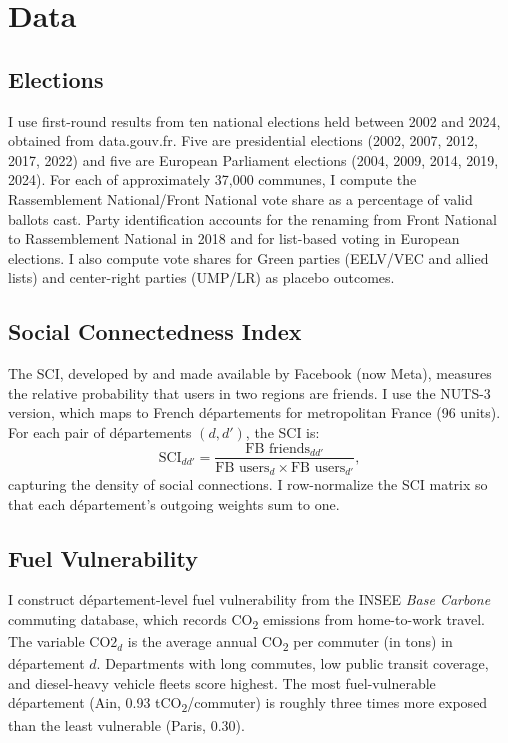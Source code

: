 \documentclass[12pt]{article}
\newcommand{\rn}{Rassemblement National}
\newcommand{\fn}{Front National}
\newcommand{\dept}{d\'{e}partement}
\newcommand{\depts}{d\'{e}partements}
\begin{document}

\section{Data}
\label{sec:data}

\subsection{Elections}

I use first-round results from ten national elections held between 2002 and 2024, obtained from data.gouv.fr. Five are presidential elections (2002, 2007, 2012, 2017, 2022) and five are European Parliament elections (2004, 2009, 2014, 2019, 2024). For each of approximately 37,000 communes, I compute the \rn{}/\fn{} vote share as a percentage of valid ballots cast. Party identification accounts for the renaming from \fn{} to \rn{} in 2018 and for list-based voting in European elections. I also compute vote shares for Green parties (EELV/VEC and allied lists) and center-right parties (UMP/LR) as placebo outcomes.

\subsection{Social Connectedness Index}

The SCI, developed by \citet{bailey2018social} and made available by Facebook (now Meta), measures the relative probability that users in two regions are friends. I use the NUTS-3 version, which maps to French \depts{} for metropolitan France (96 units). For each pair of \depts{} $(d, d')$, the SCI is:
\begin{equation}
\text{SCI}_{dd'} = \frac{\text{FB friends}_{dd'}}{\text{FB users}_d \times \text{FB users}_{d'}},
\end{equation}
capturing the density of social connections. I row-normalize the SCI matrix so that each \dept{}'s outgoing weights sum to one.

\subsection{Fuel Vulnerability}

I construct \dept{}-level fuel vulnerability from the INSEE \textit{Base Carbone} commuting database, which records CO\textsubscript{2} emissions from home-to-work travel. The variable $\text{CO2}_{d}$ is the average annual CO\textsubscript{2} per commuter (in tons) in \dept{} $d$. Departments with long commutes, low public transit coverage, and diesel-heavy vehicle fleets score highest. The most fuel-vulnerable \dept{} (Ain, 0.93 tCO\textsubscript{2}/commuter) is roughly three times more exposed than the least vulnerable (Paris, 0.30).
\end{document}
